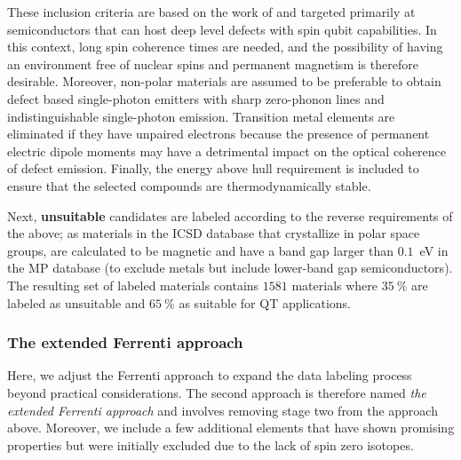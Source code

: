 \documentclass[superscriptaddress,unsortedaddress,
 amsmath,amssymb,
 aps,
]{revtex4-2}
\begin{document}
These inclusion criteria are based on the work of \citeauthor{Weber2010} \cite{Weber2010} and targeted primarily at semiconductors that can host deep level defects with spin qubit capabilities. In this context, long spin coherence times are needed, and the possibility of having an environment free of nuclear spins and permanent magnetism is therefore desirable. 
Moreover, non-polar materials are assumed to be preferable to obtain defect based single-photon emitters with sharp zero-phonon lines and indistinguishable single-photon emission.  
Transition metal elements are eliminated if they have unpaired electrons because the presence of permanent electric dipole moments may have a detrimental impact on the optical coherence of defect emission. 
Finally, the energy above hull requirement is included to ensure that the selected compounds are thermodynamically stable. 

Next, \textbf{unsuitable} candidates are labeled according to the reverse requirements of the above; as materials in the ICSD database \cite{Allen1987,Zagorac2019} 
that crystallize in polar space groups, are calculated to be magnetic and have a band gap larger than $0.1$~eV in the MP database (to exclude metals but include lower-band gap semiconductors). 
The resulting set of labeled materials contains $1581$ materials where $35 \ \%$
are labeled as unsuitable and 
$65 \ \%$ as suitable for QT applications.  

\subsubsection*{The extended Ferrenti approach}
Here, we adjust the Ferrenti approach to expand the data labeling process beyond practical  considerations. The second approach is therefore named \emph{the extended Ferrenti approach} and involves removing stage two from the approach above. Moreover, we include a few additional elements that have shown promising properties but were initially excluded due to the lack of spin zero isotopes. 
\end{document}
